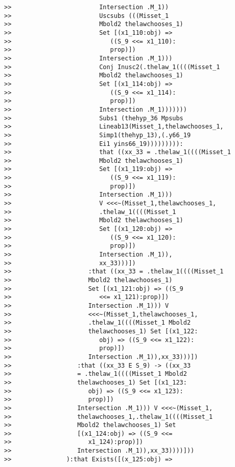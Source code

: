 \documentclass[12pt]{article}
\begin{document}
\begin{verbatim}
>>                        Intersection .M_1))
>>                        Uscsubs (((Misset_1
>>                        Mbold2 thelawchooses_1)
>>                        Set [(x1_110:obj) =>
>>                           ((S_9 <<= x1_110):
>>                           prop)])
>>                        Intersection .M_1)))
>>                        Conj Inusc2(.thelaw_1((((Misset_1
>>                        Mbold2 thelawchooses_1)
>>                        Set [(x1_114:obj) =>
>>                           ((S_9 <<= x1_114):
>>                           prop)])
>>                        Intersection .M_1)))))))
>>                        Subs1 (thehyp_36 Mpsubs
>>                        Lineab13(Misset_1,thelawchooses_1,
>>                        Simp1(thehyp_13),(.y66_19
>>                        Ei1 yins66_19))))))))):
>>                        that ((xx_33 = .thelaw_1((((Misset_1
>>                        Mbold2 thelawchooses_1)
>>                        Set [(x1_119:obj) =>
>>                           ((S_9 <<= x1_119):
>>                           prop)])
>>                        Intersection .M_1)))
>>                        V <<<~(Misset_1,thelawchooses_1,
>>                        .thelaw_1((((Misset_1
>>                        Mbold2 thelawchooses_1)
>>                        Set [(x1_120:obj) =>
>>                           ((S_9 <<= x1_120):
>>                           prop)])
>>                        Intersection .M_1)),
>>                        xx_33)))])
>>                     :that ((xx_33 = .thelaw_1((((Misset_1
>>                     Mbold2 thelawchooses_1)
>>                     Set [(x1_121:obj) => ((S_9
>>                        <<= x1_121):prop)])
>>                     Intersection .M_1))) V
>>                     <<<~(Misset_1,thelawchooses_1,
>>                     .thelaw_1((((Misset_1 Mbold2
>>                     thelawchooses_1) Set [(x1_122:
>>                        obj) => ((S_9 <<= x1_122):
>>                        prop)])
>>                     Intersection .M_1)),xx_33)))])
>>                  :that ((xx_33 E S_9) -> ((xx_33
>>                  = .thelaw_1((((Misset_1 Mbold2
>>                  thelawchooses_1) Set [(x1_123:
>>                     obj) => ((S_9 <<= x1_123):
>>                     prop)])
>>                  Intersection .M_1))) V <<<~(Misset_1,
>>                  thelawchooses_1,.thelaw_1((((Misset_1
>>                  Mbold2 thelawchooses_1) Set
>>                  [(x1_124:obj) => ((S_9 <<=
>>                     x1_124):prop)])
>>                  Intersection .M_1)),xx_33))))]))
>>               ):that Exists([(x_125:obj) =>

\end{verbatim}
\end{document}
